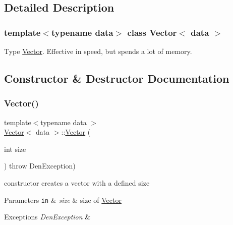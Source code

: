 \subsection{Detailed Description}
\subsubsection*{template$<$typename data$>$\newline
class Vector$<$ data $>$}

Type \hyperlink{classVector}{Vector}. Effective in speed, but spends a lot of memory. 

\subsection{Constructor \& Destructor Documentation}
\mbox{\label{classVector_aba82b0f3e3fd3d17bf2d19b04a8361b7}} 
\subsubsection{\texorpdfstring{Vector()}{Vector()}\hspace{0.1cm}{\footnotesize\ttfamily [1/5]}}
{\footnotesize\ttfamily template$<$typename data $>$ \\
\hyperlink{classVector}{Vector}$<$ data $>$\+::\hyperlink{classVector}{Vector} (\begin{DoxyParamCaption}\item[{int}]{size }\end{DoxyParamCaption}) throw  Den\+Exception) }



constructor  creates a vector with a defined size 


\begin{DoxyParams}[1]{Parameters}
\mbox{\tt in}  & {\em size} & size of \hyperlink{classVector}{Vector} \\
\hline
\end{DoxyParams}

\begin{DoxyExceptions}{Exceptions}
{\em Den\+Exception} & \\
\hline
\end{DoxyExceptions}
\mbox{\label{classVector_aede0f97bf9e72a66047d90ad8246ded1}} 
